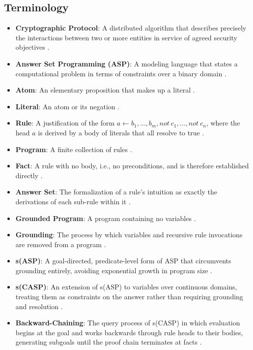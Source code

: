 \documentclass[11pt]{article}
\begin{document}
\subsection{Terminology}
\begin{itemize}
    \item \textbf{Cryptographic Protocol}: A distributed algorithm that describes precisely the interactions between two or more entities in service of agreed security objectives \cite{toorani2016securityprotocolsnutshell}.
    \item \textbf{Answer Set Programming (ASP)}: A modeling language that states a computational problem in terms of constraints over a binary domain \cite{10.1145/2043174.2043195}.
    \item \textbf{Atom}: An elementary proposition that makes up a literal \cite{10.1145/2043174.2043195}.
    \item \textbf{Literal}: An atom or its negation \cite{10.1145/2043174.2043195}.
    \item \textbf{Rule}: A justification of the form $a \leftarrow b_1,\dots, b_m, not\ c_1,\dots,not\ c_n$, where the head $a$ is derived by a body of literals that all resolve to true \cite{10.1145/2043174.2043195}.
    \item \textbf{Program}: A finite collection of rules \cite{10.1145/2043174.2043195}.
    \item \textbf{Fact}: A rule with no body, i.e., no preconditions, and is therefore established directly \cite{10.1145/2043174.2043195}.
    \item \textbf{Answer Set}: The formalization of a rule's intuition as exactly the derivations of each sub-rule within it \cite{10.1145/2043174.2043195}.
    \item \textbf{Grounded Program}: A program containing no variables \cite{10.1145/2043174.2043195}.
    \item \textbf{Grounding}: The process by which variables and recursive rule invocations are removed from a program \cite{10.1145/2043174.2043195}.
    \item \textbf{s(ASP)}: A goal-directed, predicate-level form of ASP that circumvents grounding entirely, avoiding exponential growth in program size \cite{Marple2017TheS}.
    \item \textbf{s(CASP)}: An extension of s(ASP) to variables over continuous domains, treating them as constraints on the answer rather than requiring grounding and resolution \cite{ARIAS_CARRO_SALAZAR_MARPLE_GUPTA_2018}.
    \item \textbf{Backward-Chaining}: The query process of s(CASP) in which evaluation begins at the goal and works backwards through rule heads to their bodies, generating subgoals until the proof chain terminates at facts \cite{Arias_2020}.

\end{itemize}
\end{document}
